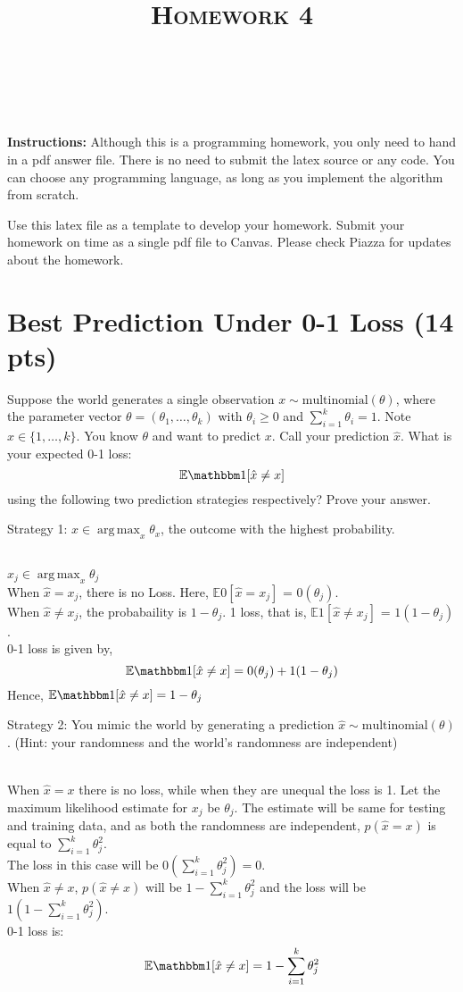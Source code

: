 \documentclass[a4paper]{article}
\title{\textsc{Homework 4}} %
\author{
\red{$AKASH SHARMA$} \\
\red{$9081731771$}\\
}
\date{}
\theoremstyle{definition}
\DeclareMathOperator*{\argmax}{arg\,max}
\def\E{\mathbb E}
\def\ind{\mathbbm 1}
\newenvironment{soln}{
    \leavevmode\color{blue}\ignorespaces
}{}
\begin{document}
\maketitle 


\textbf{Instructions:} 
Although this is a programming homework, you only need to hand in a pdf answer file.
There is no need to submit the latex source or any code.
You can choose any programming language, as long as you implement the algorithm from scratch. 

Use this latex file as a template to develop your homework.
Submit your homework on time as a single pdf file to Canvas.
Please check Piazza for updates about the homework.

\section{Best Prediction Under 0-1 Loss (14 pts)}
Suppose the world generates a single observation $x \sim \mbox{multinomial}(\theta)$, where the parameter vector $\theta=(\theta_1, \ldots, \theta_k)$ with $\theta_i\ge 0$ and $\sum_{i=1}^k \theta_i=1$.  Note $x \in \{1, \ldots, k\}$.
You know $\theta$ and want to predict $x$. 
Call your prediction $\hat x$.  What is your expected 0-1 loss: 
$$\E \ind[\hat x \neq x]$$
using the following two prediction strategies respectively?  Prove your answer.

Strategy 1: $\hat x \in \argmax_x \theta_x$, the outcome with the highest probability.
\begin{soln}
\\$x_j \in \argmax_x \theta_j$
\\When $\hat x = x_j$, there is no Loss. Here, $\E 0[\hat x = x_j]$ = $0(\theta_j)$. 
\\When $\hat x \neq x_j$, the probabaility is $1-\theta_j$. 1 loss, that is, $\E 1[\hat x \neq x_j]$  = $1(1-\theta_j)$. 
\\0-1 loss is given by, $$\E \ind[\hat x \neq x] = 0(\theta_j) + 1(1-\theta_j)$$
Hence, $\E \ind[\hat x \neq x] = 1-\theta_j$

\end{soln}

Strategy 2: You mimic the world by generating a prediction $\hat x \sim \mbox{multinomial}(\theta)$.  (Hint: your randomness and the world's randomness are independent)
\begin{soln}
\\When $\hat x = x$ there is no loss, while when they are unequal the loss is 1. Let the maximum likelihood estimate for $x_j$ be $\theta_j$. The estimate will be same for testing and training data, and as both the randomness are independent, $p(\hat x = x)$ is equal to $\sum_{i=1}^{k}\theta_j^2$. 
\\The loss in this case will be $0(\sum_{i=1}^{k}\theta_j^2) = 0$. 
\\When $\hat x \neq x$, $p(\hat x \neq x)$ will be $1 - \sum_{i=1}^{k}\theta_j^2$ and the loss will be $1(1 - \sum_{i=1}^{k}\theta_j^2)$. 
\\0-1 loss is:
$$
\E \ind[\hat x \neq x] = 1 - \sum_{i=1}^{k}\theta_j^2
$$
\end{soln}
\end{document}
